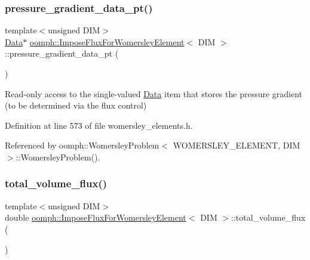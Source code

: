\subsubsection{\texorpdfstring{pressure\+\_\+gradient\+\_\+data\+\_\+pt()}{pressure\_gradient\_data\_pt()}}
{\footnotesize\ttfamily template$<$unsigned D\+IM$>$ \\
\hyperlink{classoomph_1_1Data}{Data}$\ast$ \hyperlink{classoomph_1_1ImposeFluxForWomersleyElement}{oomph\+::\+Impose\+Flux\+For\+Womersley\+Element}$<$ D\+IM $>$\+::pressure\+\_\+gradient\+\_\+data\+\_\+pt (\begin{DoxyParamCaption}{ }\end{DoxyParamCaption})\hspace{0.3cm}{\ttfamily [inline]}}



Read-\/only access to the single-\/valued \hyperlink{classoomph_1_1Data}{Data} item that stores the pressure gradient (to be determined via the flux control) 



Definition at line 573 of file womersley\+\_\+elements.\+h.



Referenced by oomph\+::\+Womersley\+Problem$<$ W\+O\+M\+E\+R\+S\+L\+E\+Y\+\_\+\+E\+L\+E\+M\+E\+N\+T, D\+I\+M $>$\+::\+Womersley\+Problem().

\mbox{\label{classoomph_1_1ImposeFluxForWomersleyElement_a9e3ca0a6477d9d4bb89d726f4e0f07b1}} 
\subsubsection{\texorpdfstring{total\+\_\+volume\+\_\+flux()}{total\_volume\_flux()}}
{\footnotesize\ttfamily template$<$unsigned D\+IM$>$ \\
double \hyperlink{classoomph_1_1ImposeFluxForWomersleyElement}{oomph\+::\+Impose\+Flux\+For\+Womersley\+Element}$<$ D\+IM $>$\+::total\+\_\+volume\+\_\+flux (\begin{DoxyParamCaption}{ }\end{DoxyParamCaption})\hspace{0.3cm}{\ttfamily [inline]}}



